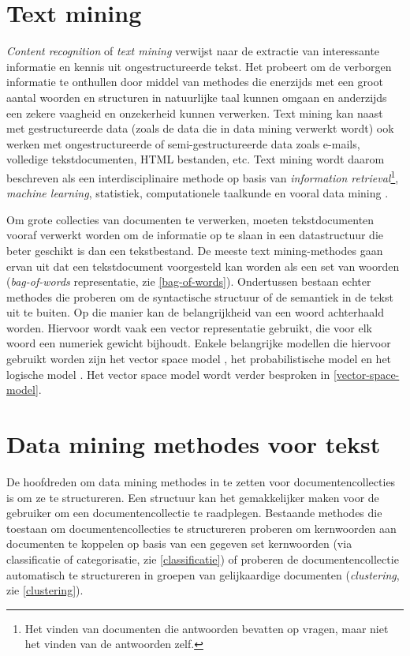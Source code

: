 \section{Text mining}\label{text-mining}
\textit{Content recognition} of \textit{text mining} verwijst naar de extractie van interessante informatie en kennis uit ongestructureerde tekst. Het probeert om de verborgen informatie te onthullen door middel van methodes die enerzijds met een groot aantal woorden en structuren in natuurlijke taal kunnen omgaan en anderzijds een zekere vaagheid en onzekerheid kunnen verwerken. Text mining kan naast met gestructureerde data (zoals de data die in data mining verwerkt wordt) ook werken met ongestructureerde of semi-gestructureerde data zoals e-mails, volledige tekstdocumenten, HTML bestanden, etc. Text mining wordt daarom beschreven als een interdisciplinaire methode op basis van \textit{information retrieval}\footnote{Het vinden van documenten die antwoorden bevatten op vragen, maar niet het vinden van de antwoorden zelf.},\textit{ machine learning}, statistiek, computationele taalkunde en vooral data mining  \cite{Hotho2005}. 

Om grote collecties van documenten te verwerken, moeten tekstdocumenten vooraf verwerkt worden om de informatie op te slaan in een datastructuur die beter geschikt is dan een tekstbestand. De meeste text mining-methodes gaan ervan uit dat een tekstdocument voorgesteld kan worden als een set van woorden (\textit{bag-of-words} representatie, zie \ref{bag-of-words}). Ondertussen bestaan echter methodes die proberen om de syntactische structuur of de semantiek in de tekst uit te buiten. Op die manier kan de belangrijkheid van een woord achterhaald worden. Hiervoor wordt vaak een vector representatie gebruikt, die voor elk woord een numeriek gewicht bijhoudt. Enkele belangrijke modellen die hiervoor gebruikt worden zijn het vector space model \cite{Salton1975}, het probabilistische model \cite{ROBERTSON1977} en het logische model \cite{Rigsbergen1986}. Het vector space model wordt verder besproken in \ref{vector-space-model}.

\section{Data mining methodes voor tekst}
De hoofdreden om data mining methodes in te zetten voor documentencollecties is om ze te structureren. Een structuur kan het gemakkelijker maken voor de gebruiker om een documentencollectie te raadplegen. Bestaande methodes die toestaan om documentencollecties te structureren proberen om kernwoorden aan documenten te koppelen op basis van een gegeven set kernwoorden (via classificatie of categorisatie, zie \ref{classificatie}) of proberen de documentencollectie automatisch te structureren in groepen van gelijkaardige documenten (\textit{clustering}, zie \ref{clustering}).


